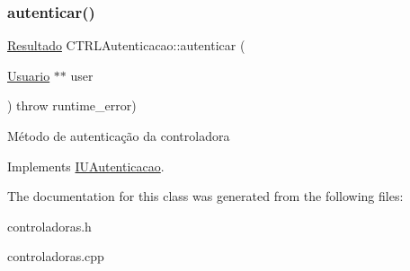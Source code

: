 \subsubsection{\texorpdfstring{autenticar()}{autenticar()}}
{\footnotesize\ttfamily \hyperlink{classResultado}{Resultado} C\+T\+R\+L\+Autenticacao\+::autenticar (\begin{DoxyParamCaption}\item[{\hyperlink{classUsuario}{Usuario} $\ast$$\ast$}]{user }\end{DoxyParamCaption}) throw  runtime\+\_\+error) \hspace{0.3cm}{\ttfamily [virtual]}}

Método de autenticação da controladora 

Implements \hyperlink{classIUAutenticacao}{I\+U\+Autenticacao}.



The documentation for this class was generated from the following files\+:\begin{DoxyCompactItemize}
\item 
controladoras.\+h\item 
controladoras.\+cpp\end{DoxyCompactItemize}
